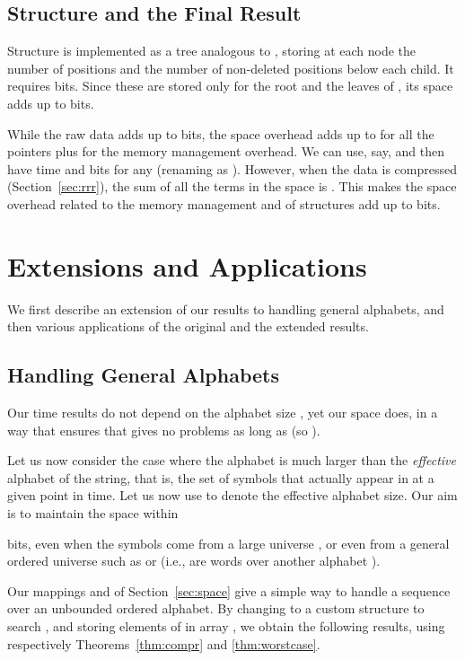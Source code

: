 \documentclass[11pt]{article}
\begin{document}
\subsection{Structure  and the Final Result}

Structure  is implemented as a tree  analogous to , storing at 
each node the number 
of positions and the number of non-deleted positions below each child. It
requires  bits. Since these are stored only for
the root  and the leaves  of , its space adds up to
 bits.

While the raw data adds up to  bits, the space overhead adds up
to  for all the pointers plus
 for the memory management overhead. 
We can use, say,  and then have  time and
 bits for any 
 (renaming  as ).
However, when the data is compressed (Section~\ref{sec:rrr}), the sum of all the
 terms in the space is .
This makes the space overhead related to the memory management and of
 structures add up to 
bits.

\section{Extensions and Applications}
\label{sec:app}

We first describe an extension of our results to handling general alphabets,
and then various applications of the original and the extended results.

\subsection{Handling General Alphabets}
\label{sec:alphabet}

Our time results do not depend on the alphabet size , yet our space 
does, in a way that ensures that  gives no problems as long as 
 (so ).

Let us now consider the case where the alphabet  is much larger than
the {\em effective} alphabet of the string, that is, the set of symbols that 
actually appear in  at a given point in time. Let us now use 
to denote the effective alphabet size. Our aim is to maintain the space within 
 
bits, even when the symbols come from a large universe , 
or even from a general ordered universe such as  or
 (i.e.,  are words over another
alphabet ).

Our mappings  and  of Section~\ref{sec:space} 
give a simple way to handle a 
sequence over an unbounded ordered alphabet. By changing 
to a custom structure to search , and storing elements of 
 in array , we obtain the following results, using respectively
Theorems~\ref{thm:compr} and \ref{thm:worstcase}.
\end{document}
